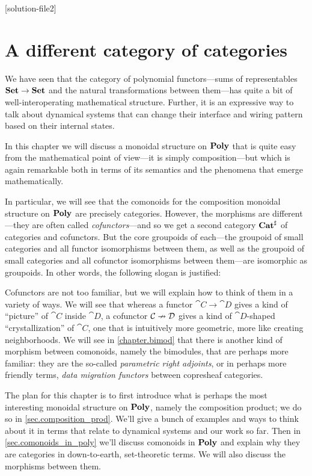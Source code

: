 \documentclass[Book-Poly]{subfiles}
\begin{document}
%


\setcounter{chapter}{1}%
[solution-file2]

\chapter{A different category of categories}\label{chapter.comon}

We have seen that the category of polynomial functors---sums of representables $\mathbf{Set}\to\mathbf{Set}$ and the natural transformations between them---has quite a bit of well-interoperating mathematical structure. Further, it is an expressive way to talk about dynamical systems that can change their interface and wiring pattern based on their internal states.

In this chapter we will discuss a monoidal structure on $\mathbf{Poly}$ that is quite easy from the mathematical point of view---it is simply composition---but which is again remarkable both in terms of its semantics and the phenomena that emerge mathematically. 

In particular, we will see that the comonoids for the composition monoidal structure on $\mathbf{Poly}$ are precisely categories. However, the morphisms are different---they are often called \emph{cofunctors}---and so we get a second category $\mathbf{Cat}^\sharp$ of categories and cofunctors. But the core groupoids of each---the groupoid of small categories and all functor isomorphisms between them, as well as the groupoid of small categories and all cofunctor isomorphisms between them---are isomorphic as groupoids. In other words, the following slogan is justified:

Cofunctors are not too familiar, but we will explain how to think of them in a variety of ways. We will see that whereas a functor $\cat{C}\to\cat{D}$ gives a kind of ``picture'' of $\cat{C}$ inside $\cat{D}$, a cofunctor $\mathcal{C}\nrightarrow\mathcal{D}$ gives a kind of $\cat{D}$-shaped ``crystallization'' of $\cat{C}$, one that is intuitively more geometric, more like creating neighborhoods. We will see in \cref{chapter.bimod} that there is another kind of morphism between comonoids, namely the bimodules, that are perhaps more familiar: they are the so-called \emph{parametric right adjoints}, or in perhaps more friendly terms, \emph{data migration functors} between copresheaf categories.

The plan for this chapter is to first introduce what is perhaps the most interesting monoidal structure on $\mathbf{Poly}$, namely the composition product; we do so in \cref{sec.composition_prod}. We'll give a bunch of examples and ways to think about it in terms that relate to dynamical systems and our work so far. Then in \cref{sec.comonoids_in_poly} we'll discuss comonoids in $\mathbf{Poly}$ and explain why they are categories in down-to-earth, set-theoretic terms. We will also discuss the morphisms between them.
\end{document}
